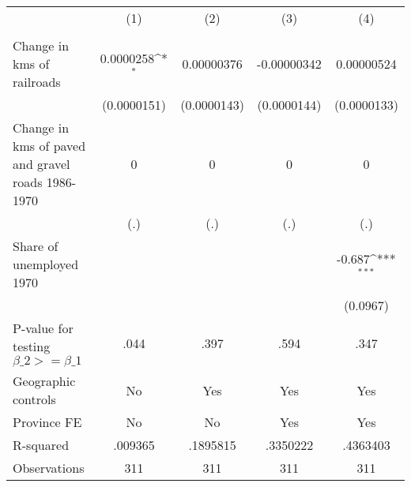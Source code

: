 {
\def\sym#1{\ifmmode^{#1}\else\(^{#1}\)\fi}
\begin{tabular}{l*{4}{c}}
\hline\hline
                &\multicolumn{1}{c}{(1)}&\multicolumn{1}{c}{(2)}&\multicolumn{1}{c}{(3)}&\multicolumn{1}{c}{(4)}\\
                &\multicolumn{1}{c}{}&\multicolumn{1}{c}{}&\multicolumn{1}{c}{}&\multicolumn{1}{c}{}\\
\hline
Change in kms of railroads&0.0000258\sym{*}  &0.00000376         &-0.00000342         &0.00000524         \\
                &(0.0000151)         &(0.0000143)         &(0.0000144)         &(0.0000133)         \\
[1em]
Change in kms of paved and gravel roads 1986-1970&        0         &        0         &        0         &        0         \\
                &      (.)         &      (.)         &      (.)         &      (.)         \\
[1em]
Share of unemployed 1970&                  &                  &                  &   -0.687\sym{***}\\
                &                  &                  &                  & (0.0967)         \\
\hline
P-value for testing $\beta\_{2} >= \beta\_{1}$&     .044         &     .397         &     .594         &     .347         \\
Geographic controls&       No         &      Yes         &      Yes         &      Yes         \\
Province FE     &       No         &       No         &      Yes         &      Yes         \\
R-squared       &  .009365         & .1895815         & .3350222         & .4363403         \\
Observations    &      311         &      311         &      311         &      311         \\
\hline\hline
\end{tabular}
}

